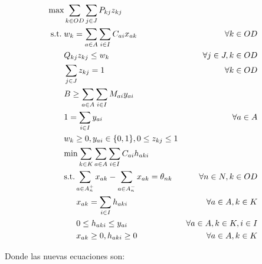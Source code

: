 \documentclass{article}
\newcommand{\modelspace}{\hspace{1.5em}}
\begin{document}
  \begin{align}
    \text{max}    & \sum_{k \in OD} \sum_{j \in J} P_{kj} z_{kj}                                     & \label{eq:objective1lvlfinal} \\
    \text{s.t.}\; & w_k = \sum_{a \in A} \sum_{i \in I} C_{ai}x_{ak}                                 & \forall k \in OD \label{eq:shortestpathfinal} \\
                  & Q_{kj} z_{kj} \leq w_k                                                           & \forall j \in J, k \in OD \label{eq:breakpoints} \\
                  & \sum_{j \in J} z_{kj} = 1                                                        & \forall k \in OD \label{eq:singularbreakpoint} \\
                  & B \geq \sum_{a \in A} \sum_{i \in I} M_{ai}y_{ai}                                & \label{eq:respectbudgetfinal} \\
                  & 1 = \sum_{i \in I} y_{ai}                                                        & \forall a \in A \label{eq:alwaysoneyfinal} \\
                  & w_k \geq 0, y_{ai} \in \{ 0, 1\}, 0 \leq z_{kj} \leq 1                           & \nonumber \\
                  & \text{min} \sum_{k \in K} \sum_{a \in A} \sum_{i \in I} C_{ai} h_{aki}           & \label{eq:subproblemfinal} \\
                  & \text{s.t.} \sum_{a \in A_n^+} x_{ak} - \sum_{a \in A_n^-} x_{ak} = \theta_{nk}  & \forall n \in N, k \in OD \label{eq:flowbalancefinal} \\
                  & \modelspace x_{ak} = \sum_{i \in I} h_{aki}                                      & \forall a \in A, k \in K \label{eq:flowactivation} \\
                  & \modelspace 0 \leq h_{aki} \leq y_{ai}                                           & \forall a \in A, k \in K, i \in I \label{eq:respectinfra} \\
                  & \modelspace x_{ak} \geq 0, h_{aki} \geq 0                                        & \forall a \in A, k \in K \nonumber
  \end{align}

  Donde las nuevas ecuaciones son:
\end{document}
